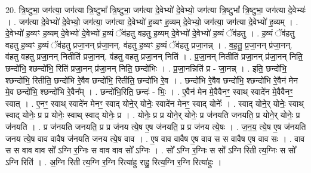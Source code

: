 \documentclass[17pt]{extarticle}
\begin{document}
20. त्रि॒ष्टुभा॒ जग॑त्या॒ जग॑त्या त्रि॒ष्टुभा᳚ त्रि॒ष्टुभा॒ जग॑त्या दे॒वेभ्यो॑ दे॒वेभ्यो॒ जग॑त्या त्रि॒ष्टुभा᳚ त्रि॒ष्टुभा॒ जग॑त्या दे॒वेभ्यः॑ । . जग॑त्या दे॒वेभ्यो॑ दे॒वेभ्यो॒ जग॑त्या॒ जग॑त्या दे॒वेभ्यो॑ ह॒व्यꣳ ह॒व्यम् दे॒वेभ्यो॒ जग॑त्या॒ जग॑त्या दे॒वेभ्यो॑ ह॒व्यम् । . दे॒वेभ्यो॑ ह॒व्यꣳ ह॒व्यम् दे॒वेभ्यो॑ दे॒वेभ्यो॑ ह॒व्यं ॅव॑हतु वहतु ह॒व्यम् दे॒वेभ्यो॑ दे॒वेभ्यो॑ ह॒व्यं ॅव॑हतु । . ह॒व्यं ॅव॑हतु वहतु ह॒व्यꣳ ह॒व्यं ॅव॑हतु प्रजा॒नन् प्र॑जा॒नन्. व॑हतु ह॒व्यꣳ ह॒व्यं ॅव॑हतु प्रजा॒नन्न् । . व॒ह॒तु॒ प्र॒जा॒नन् प्र॑जा॒नन्. व॑हतु वहतु प्रजा॒नन् नितीति॑ प्रजा॒नन्. व॑हतु वहतु प्रजा॒नन् निति॑ । . प्र॒जा॒नन् नितीति॑ प्रजा॒नन् प्र॑जा॒नन् निति॒ छन्दो॑भि॒ श्छन्दो॑भि॒ रिति॑ प्रजा॒नन् प्र॑जा॒नन् निति॒ छन्दो॑भिः । . प्र॒जा॒नन्निति॑ प्र - जा॒नन्न् । . इति॒ छन्दो॑भि॒ श्छन्दो॑भि॒ रितीति॒ छन्दो॑भि रे॒वैव छन्दो॑भि॒ रितीति॒ छन्दो॑भि रे॒व । . छन्दो॑भि रे॒वैव छन्दो॑भि॒ श्छन्दो॑भि रे॒वैन॑ मेन मे॒व छन्दो॑भि॒ श्छन्दो॑भि रे॒वैन᳚म् । . छन्दो॑भि॒रिति॒ छन्दः॑ - भिः॒ । . ए॒वैन॑ मेन मे॒वैवैनꣳ॒॒ स्वाथ् स्वादे॑न मे॒वैवैनꣳ॒॒ स्वात् । . ए॒नꣳ॒॒ स्वाथ् स्वादे॑न मेनꣳ॒॒ स्वाद् योने॒र् योनेः॒ स्वादे॑न मेनꣳ॒॒ स्वाद् योनेः᳚ । . स्वाद् योने॒र् योनेः॒ स्वाथ् स्वाद् योनेः॒ प्र प्र योनेः॒ स्वाथ् स्वाद् योनेः॒ प्र । . योनेः॒ प्र प्र योने॒र् योनेः॒ प्र ज॑नयति जनयति॒ प्र योने॒र् योनेः॒ प्र ज॑नयति । . प्र ज॑नयति जनयति॒ प्र प्र ज॑नय त्ये॒ष ए॒ष ज॑नयति॒ प्र प्र ज॑नय त्ये॒षः । . ज॒न॒य॒ त्ये॒ष ए॒ष ज॑नयति जनय त्ये॒ष वाव वावैष ज॑नयति जनय त्ये॒ष वाव । . ए॒ष वाव वावैष ए॒ष वाव स स वावैष ए॒ष वाव सः । . वाव स स वाव वाव सो᳚ ऽग्नि र॒ग्निः स वाव वाव सो᳚ ऽग्निः । . सो᳚ ऽग्नि र॒ग्निः स सो᳚ ऽग्नि रिती त्य॒ग्निः स सो᳚ ऽग्नि रिति॑ । . अ॒ग्नि रिती त्य॒ग्नि र॒ग्नि रित्या॑हु राहु॒ रित्य॒ग्नि र॒ग्नि रित्या॑हुः । \newline
\end{document}

